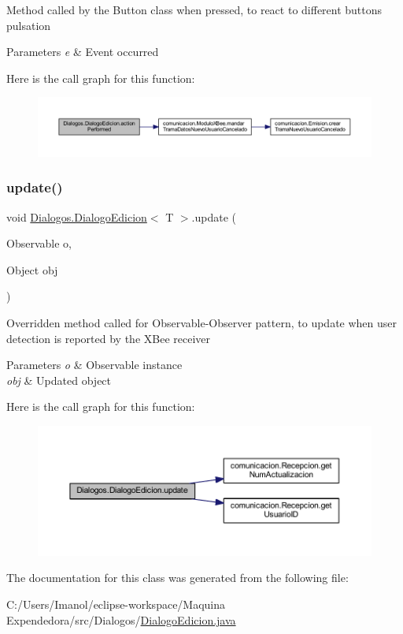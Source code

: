 Method called by the Button class when pressed, to react to different button\textquotesingle{}s pulsation 
\begin{DoxyParams}{Parameters}
{\em e} & Event occurred \\
\hline
\end{DoxyParams}
Here is the call graph for this function\+:
\nopagebreak
\begin{figure}[H]
\begin{center}
\leavevmode
\includegraphics[width=350pt]{class_dialogos_1_1_dialogo_edicion_a78705fff13d0b9999644b7a31ffea151_cgraph}
\end{center}
\end{figure}
\mbox{\label{class_dialogos_1_1_dialogo_edicion_afcbec7817a74ba686ef1a00a33b48484}} 
\subsubsection{\texorpdfstring{update()}{update()}}
{\footnotesize\ttfamily void \mbox{\hyperlink{class_dialogos_1_1_dialogo_edicion}{Dialogos.\+Dialogo\+Edicion}}$<$ T $>$.update (\begin{DoxyParamCaption}\item[{Observable}]{o,  }\item[{Object}]{obj }\end{DoxyParamCaption})}

Overridden method called for Observable-\/\+Observer pattern, to update when user detection is reported by the X\+Bee receiver 
\begin{DoxyParams}{Parameters}
{\em o} & Observable instance \\
\hline
{\em obj} & Updated object \\
\hline
\end{DoxyParams}
Here is the call graph for this function\+:
\nopagebreak
\begin{figure}[H]
\begin{center}
\leavevmode
\includegraphics[width=350pt]{class_dialogos_1_1_dialogo_edicion_afcbec7817a74ba686ef1a00a33b48484_cgraph}
\end{center}
\end{figure}


The documentation for this class was generated from the following file\+:\begin{DoxyCompactItemize}
\item 
C\+:/\+Users/\+Imanol/eclipse-\/workspace/\+Maquina Expendedora/src/\+Dialogos/\mbox{\hyperlink{_dialogo_edicion_8java}{Dialogo\+Edicion.\+java}}\end{DoxyCompactItemize}
